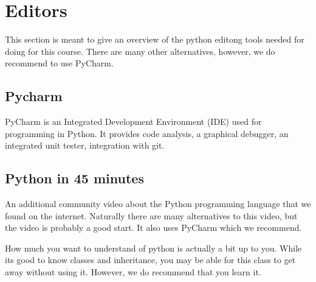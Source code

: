 \section{Editors}\label{introduction}

This section is meant to give an overview of the python editong tools needed for doing for this course. There are many other alternatives, however, we do recommend to use PyCharm.

\subsection{Pycharm}\label{s:pycharm}

PyCharm is an Integrated Development Environment (IDE) used for programming in
Python. It provides code analysis, a graphical debugger, an integrated
unit tester, integration with git.


\subsection{Python in 45 minutes}\label{python-in-45-minutes}

An additional community video about the Python programming language that
we found on the internet. Naturally there are many alternatives to this
video, but the video is probably a good start. It also uses PyCharm
which we recommend.


How much you want to understand of python is actually a bit up to you.
While its good to know classes and inheritance, you may be able for this
class to get away without using it. However, we do recommend that you
learn it.

